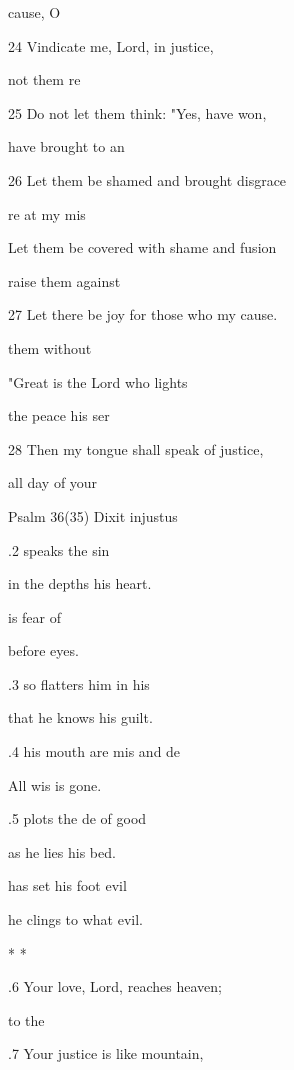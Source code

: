   cause, O  

24 Vindicate me, Lord, in  justice, 

 not  them re 

25 Do not let them think: "Yes,  have won, 

 have brought  to an  

26 Let them be shamed and brought  disgrace 

 re at my mis 

Let them be covered with shame and fusion 

 raise them against  

27 Let there be joy for those who  my cause. 

 them  without  

"Great is the Lord who lights 

 the peace  his ser 

28 Then my tongue shall speak of  justice, 

 all day  of your  

Psalm 36(35) Dixit injustus 


.2  speaks  the sin 

in the depths  his heart. 

 is  fear of  

before  eyes. 

.3  so flatters him in his  

that he knows  his guilt. 

.4  his mouth are mis and de 

All wis is gone. 

.5  plots the de of good 

as he lies  his bed. 

 has set his foot  evil  

he clings to what  evil. 

\mi{*} \pl{* * *} * * \pl{*} 

.6 Your love, Lord, reaches  heaven; 

  to the  

.7 Your justice is like  mountain, 


